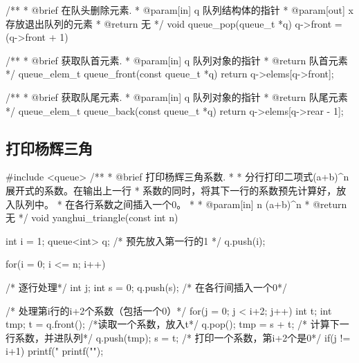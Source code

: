 \begin{Codex}[label=queue.c]
/**
  * @brief 在队头删除元素.
  * @param[in] q 队列结构体的指针
  * @param[out] x 存放退出队列的元素
  * @return 无
  */
void queue_pop(queue_t *q) {
    q->front = (q->front + 1) %
}

/**
 * @brief 获取队首元素.
 * @param[in] q 队列对象的指针
 * @return 队首元素
 */
queue_elem_t queue_front(const queue_t *q) {
    return q->elems[q->front];
}

/**
 * @brief 获取队尾元素.
 * @param[in] q 队列对象的指针
 * @return 队尾元素
 */
queue_elem_t queue_back(const queue_t *q) {
    return q->elems[q->rear - 1];
}
\end{Codex}

\subsection{打印杨辉三角}

\begin{Codex}[label=yanghui_triangle.cpp]
#include <queue>
/**
 * @brief 打印杨辉三角系数.
 *
 * 分行打印二项式(a+b)^n展开式的系数。在输出上一行
 * 系数的同时，将其下一行的系数预先计算好，放入队列中。
 * 在各行系数之间插入一个0。
 *
 * @param[in] n (a+b)^n
 * @return 无
 */
void yanghui_triangle(const int n) {
    int i = 1;
    queue<int> q;
    /* 预先放入第一行的1 */
    q.push(i);

    for(i = 0; i <= n; i++) {     /* 逐行处理*/
        int j;
        int s = 0;
        q.push(s);      /* 在各行间插入一个0*/

        /* 处理第i行的i+2个系数（包括一个0）*/
        for(j = 0; j < i+2; j++) {
            int t;
            int tmp;
            t = q.front();  /*读取一个系数，放入t*/
            q.pop();
            tmp = s + t;      /* 计算下一行系数，并进队列*/
            q.push(tmp);
            s = t;            /* 打印一个系数，第i+2个是0*/
            if(j != i+1) {
                printf("%
            }
        }
        printf("\n"); 
    }
}
\end{Codex}
